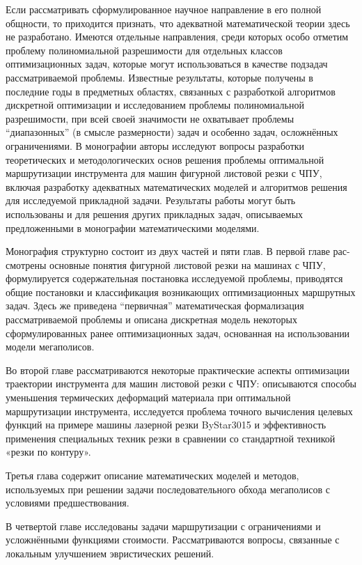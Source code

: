 \documentclass[12pt,twoside]{report}
\begin{document}
Если рассматривать сформулированное научное направление в его полной общности,
то приходится признать, что адекватной математической теории здесь не разработано.
Имеются отдельные направления, среди которых особо отметим проблему полиномиальной разрешимости
для отдельных классов оптимизационных задач,
которые могут использоваться в качестве подзадач рассматриваемой проблемы.
Известные результаты, которые получены в последние годы в предметных областях,
связанных с разработкой алгоритмов дискретной оптимизации
и исследованием проблемы полиномиальной разрешимости,
при всей своей значимости не охватывает проблемы “диапазонных”
(в смысле размерности) задач и особенно задач,
осложнённых ограничениями.
В монографии авторы исследуют вопросы разработки
теоретических и методологических основ решения проблемы
оптимальной маршрутизации инструмента для машин фигурной листовой резки с ЧПУ,
включая разработку адекватных математических моделей
и алгоритмов решения для исследуемой прикладной задачи.
Результаты работы могут быть использованы и для решения
других прикладных задач,
описываемых предложенными в монографии математическими моделями.

Монография структурно состоит из двух частей и пяти глав.
В первой главе рас-смотрены основные понятия
фигурной листовой резки на машинах с ЧПУ,
формулируется содержательная постановка исследуемой проблемы,
приводятся общие постановки и классификация
возникающих оптимизационных маршрутных задач.
Здесь же приведена “первичная” математическая формализация
рассматриваемой проблемы и описана дискретная модель
некоторых сформулированных ранее оптимизационных задач,
основанная на использовании модели мегаполисов.

Во второй главе рассматриваются некоторые
практические аспекты оптимизации траектории
инструмента для машин листовой резки с ЧПУ:
описываются способы уменьшения термических деформаций
материала при оптимальной маршрутизации инструмента,
исследуется проблема точного вычисления целевых функций
на примере машины лазерной резки ByStar3015
и эффективность применения специальных техник резки
в сравнении со стандартной техникой «резки по контуру».

Третья глава содержит описание математических моделей и методов,
используемых при решении задачи последовательного обхода
мегаполисов с условиями предшествования.

В четвертой главе исследованы задачи маршрутизации
с ограничениями и усложнёнными функциями стоимости.
Рассматриваются вопросы, связанные с
локальным улучшением эвристических решений.
\end{document}
